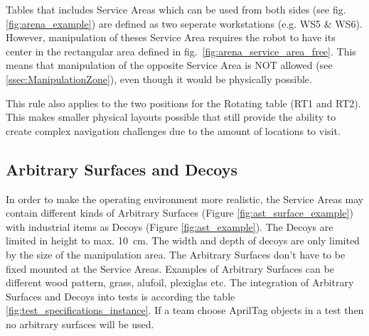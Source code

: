 Tables that includes Service Areas which can be used from both sides (see fig. \ref{fig:arena_example}) are defined as two seperate workstations (e.g. WS5 \& WS6). However, manipulation of theses Service Area requires the robot to have its center in the rectangular area defined in fig.~\ref{fig:arena_service_area_free}. This means that manipulation of the opposite Service Area is NOT allowed (see \ref{ssec:ManipulationZone}), even though it would be physically possible.

This rule also applies to the two positions for the Rotating table (RT1 and RT2).
This makes smaller physical layouts possible that still provide the ability to create complex navigation challenges due to the amount of locations to visit.


\subsection{Arbitrary Surfaces and Decoys}
\label{subsec:Arbitrary_Surfaces_and_Decoys}

In order to make the operating environment more realistic, the Service Areas may contain different kinds of Arbitrary Surfaces (Figure \ref{fig:ast_surface_example}) with industrial items as Decoys (Figure \ref{fig:ast_example}). The Decoys are limited in height to max. 10~cm. The width and depth of decoys are only limited by the size of the manipulation area. The Arbitrary Surfaces don't have to be fixed mounted at the Service Areas. Examples of Arbitrary Surfaces can be different wood pattern, grass, alufoil, plexiglas etc. The integration of Arbitrary Surfaces and Decoys into tests is according the table \ref{fig:test_specifications_instance}. If a team choose AprilTag objects in a test then no arbitrary surfaces will be used.


